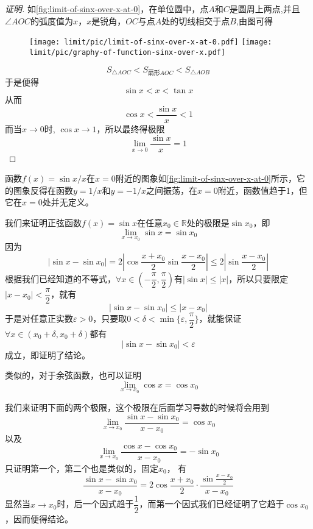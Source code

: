 \begin{proof}[证明]

  如\autoref{fig:limit-of-sinx-over-x-at-0}，在单位圆中，点$A$和$C$是圆周上两点,并且$\angle AOC$的弧度值为$x$，$x$是锐角，$OC$与点$A$处的切线相交于点$B$,由图可得
  
\begin{figure}[htbp]
\centering
\texttt{[image: limit/pic/limit-of-sinx-over-x-at-0.pdf]}
\texttt{[image: limit/pic/graphy-of-function-sinx-over-x.pdf]}
\caption{}
\label{fig:limit-of-sinx-over-x-at-0}
\end{figure}

  \[ S_{\triangle AOC} < S_{\text{扇形}AOC} < S_{\triangle AOB} \]
  于是便得
  \[ \sin{x} < x < \tan{x} \]
  从而
  \[ \cos{x} < \frac{\sin{x}}{x} < 1 \]
  而当$x \to 0$时, $\cos{x} \to 1$，所以最终得极限
  \[ \lim_{x \to 0} \frac{\sin{x}}{x} = 1 \]
\end{proof}

函数$f(x)=\sin{x}/x$在$x=0$附近的图象如\autoref{fig:limit-of-sinx-over-x-at-0}所示，它的图象反得在函数$y=1/x$和$y=-1/x$之间振荡，在$x=0$附近，函数值趋于1，但它在$x=0$处并无定义。

\begin{example}
  \label{example:limit-of-sin-cos-function}
  我们来证明正弦函数$f(x)=\sin{x}$在任意$x_0 \in \mathbb{R}$处的极限是$\sin{x_0}$，即
  \[ \lim_{x \to x_0} \sin{x} = \sin{x_0} \]
  因为
  \[ |\sin{x}-\sin{x_0}| = 2 \left| \cos{\frac{x+x_0}{2}} \sin{\frac{x-x_0}{2}} \right| \leqslant 2 \left| \sin{\frac{x-x_0}{2}} \right| \]
  根据我们已经知道的不等式，$\forall x \in \left(- \dfrac{\pi}{2}, \dfrac{\pi}{2} \right)$有$|\sin{x}| \leqslant |x|$，所以只要限定$|x-x_0|<\dfrac{\pi}{2}$，就有
  \[ |\sin{x}-\sin{x_0}| \leqslant |x-x_0| \]
  于是对任意正实数$\varepsilon>0$，只要取$0<\delta<\min\{\varepsilon, \dfrac{\pi}{2}\}$，就能保证$\forall x \in ( x_0+\delta,x_0+\delta )$都有
  \[ |\sin{x}-\sin{x_0}| < \varepsilon \]
  成立，即证明了结论。

  类似的，对于余弦函数，也可以证明
  \[ \lim_{x \to x_0} \cos{x} = \cos{x_0} \]
\end{example}

\begin{example}
  我们来证明下面的两个极限，这个极限在后面学习导数的时候将会用到
  \[ \lim_{x \to x_0} \frac{\sin{x}-\sin{x_0}}{x-x_0} = \cos{x_0} \]
  以及
  \[ \lim_{x \to x_0} \frac{\cos{x}-\cos{x_0}}{x-x_0} = -\sin{x_0} \]
  只证明第一个，第二个也是类似的，固定$x_0$，
  有
  \[ \frac{\sin{x}-\sin{x_0}}{x-x_0} = 2\cos{\frac{x+x_0}{2}} \cdot \frac{\sin{\frac{x-x_0}{2}}}{x-x_0} \]
  显然当$x \to x_0$时，后一个因式趋于$\dfrac{1}{2}$，而第一个因式我们已经证明了它趋于$\cos{x_0}$，因而便得结论。
\end{example}

